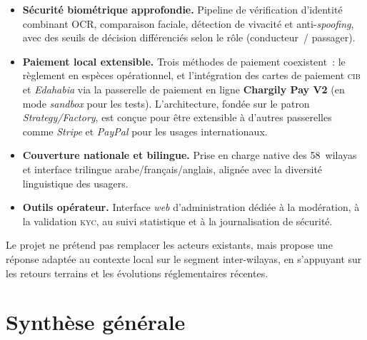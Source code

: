 \documentclass[12pt, a4paper, oneside]{report}
\begin{document}
\begin{itemize}
  \item \textbf{Sécurité biométrique approfondie.} Pipeline de vérification d'identité combinant OCR, comparaison faciale, détection de vivacité et anti-\textit{spoofing}, avec des seuils de décision différenciés selon le rôle (conducteur~/ passager).
  \item \textbf{Paiement local extensible.} Trois méthodes de paiement coexistent~: le règlement en espèces opérationnel, et l'intégration des cartes de paiement \textsc{cib} et \textit{Edahabia} via la passerelle de paiement en ligne \textbf{Chargily Pay V2} (en mode \textit{sandbox} pour les tests). L'architecture, fondée sur le patron \textit{Strategy/Factory}, est conçue pour être extensible à d'autres passerelles comme \textit{Stripe} et \textit{PayPal} pour les usages internationaux.
  \item \textbf{Couverture nationale et bilingue.} Prise en charge native des 58~wilayas et interface trilingue arabe/français/anglais, alignée avec la diversité linguistique des usagers.
  \item \textbf{Outils opérateur.} Interface \textit{web} d'administration dédiée à la modération, à la validation \textsc{kyc}, au suivi statistique et à la journalisation de sécurité.
\end{itemize}

Le projet ne prétend pas remplacer les acteurs existants, mais propose une réponse adaptée au contexte local sur le segment inter-wilayas, en s'appuyant sur les retours terrains et les évolutions réglementaires récentes.

\section{Synthèse générale}
\label{sec:synthese}
\end{document}
